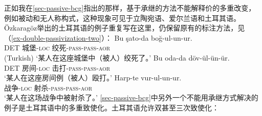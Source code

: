 \begin{exe}
\begin{xlist}[iv.]
\begin{exe}
\begin{xlist}[iv.]
正如我在\ref{sec-passive-bcg}指出的那样，基于承继的方法不能解释价的多重改变，例如被动和无人称构式，这种现象可见于立陶宛语\citep[Section~5]{Timberlake82a}、爱尔兰语\citep{Noonan94a}和土耳其语\citep{Ozkaragoez86a}。Özkaragöz举出的土耳其语的例子重复写在这里，仍保留原有的标注方法，见（\ref{ex-double-passivization-two}）：
\eal\label{ex-double-passivization-two}
\ex\label{ex-double-passivization-strangle-two}
\gll Bu şato-da boğ-ul-un-ur.\\
     DET 城堡-\textsc{loc} 绞死-\textsc{pass}-\textsc{pass}-\textsc{aor}\\\hfill(Turkish)
\glt `某人在这座城堡中（被人）绞死了。'
\ex\label{ex-double-passivization-hit-two}
\gll Bu oda-da döv-ül-ün-ür.\\
     DET 房间-\textsc{loc} 击打-\textsc{pass}-\textsc{pass}-\textsc{aor}\\
\glt `某人在这座房间例（被人）殴打。'
\ex
\gll Harp-te vur-ul-un-ur.\\
     战争-\textsc{loc} 射杀-\textsc{pass}-\textsc{pass}-\textsc{aor}\\
\glt `某人在这场战争中被射杀了。'
\zl
\addlines
\ref{sec-passive-bcg}中另外一个不能用承继方式解决的例子是土耳其语中的多重致使化。土耳其语允许双甚至三次致使化\citep[]{Lewis67a-u}：

\end{xlist}
\end{exe}
\end{xlist}
\end{exe}
